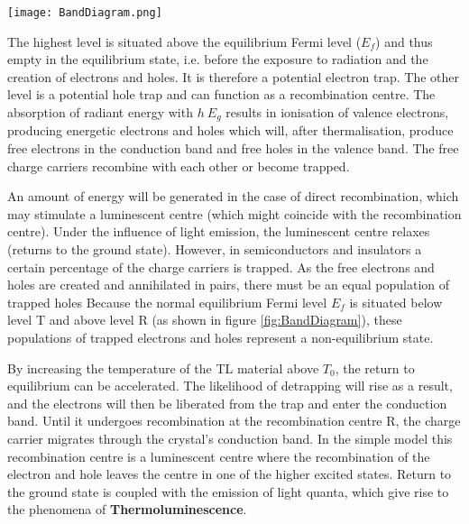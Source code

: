 \documentclass[../../Report.tex]{subfiles}
\begin{document}
        \begin{Figure}
            \centering
            \texttt{[image: BandDiagram.png]}
            \label{fig:BandDiagram}
        \end{Figure}
        
        The highest level is situated above the equilibrium Fermi level ($E_f$) and thus empty in the equilibrium state, 
        i.e. before the exposure to radiation and the creation of electrons and holes. It is therefore a potential 
        electron trap. The other level is a potential hole trap and can function as a recombination centre. 
        The absorption of radiant energy with $h \> E_g$ results in ionisation of valence electrons, producing 
        energetic electrons and holes which will, after thermalisation, produce free electrons in the conduction 
        band and free holes in the valence band. The free charge carriers recombine with each other or become trapped.

        An amount of energy will be generated in the case of direct recombination, which may stimulate a luminescent 
        centre (which might coincide with the recombination centre). Under the influence of light emission, the 
        luminescent centre relaxes (returns to the ground state).  However, in semiconductors and insulators a
        certain percentage of the charge carriers is trapped. As the free electrons and holes are created and annihilated
        in pairs, there must be an equal population of trapped holes Because the normal equilibrium Fermi level $E_f$ is
        situated below level T and above level R (as shown in figure \ref{fig:BandDiagram}), these populations of
        trapped electrons and holes represent a non-equilibrium state.

        By increasing the temperature of the TL material above $T_0$, the return to equilibrium can be accelerated. 
        The likelihood of detrapping will rise as a result, and the electrons will then be liberated from the trap and 
        enter the conduction band. Until it undergoes recombination at the recombination centre R, the charge carrier 
        migrates through the crystal's conduction band. In the simple model this recombination centre is a luminescent
        centre where the recombination of the electron and hole leaves the centre in one of the higher excited states. 
        Return to the ground state is coupled with the emission of light quanta, which give rise to the phenomena of 
        \textbf{Thermoluminescence}.
\end{document}
